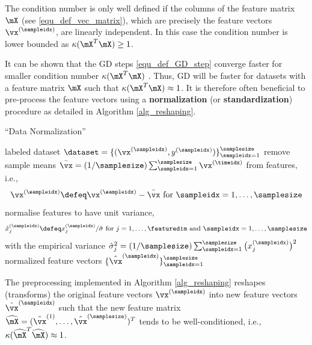 \documentclass[12pt]{report}
\begin{document}
The condition number is only well defined if the columns of the feature matrix $\mX$ 
(see \eqref{equ_def_vec_matrix}), which are precisely the feature vectors $\vx^{(\sampleidx)}$, 
are linearly independent. In this case the condition number is lower bounded 
as $\kappa( \mX^{T} \mX) \geq 1$. 

It can be shown that the GD steps \eqref{equ_def_GD_step} converge faster for 
smaller condition number $\kappa( \mX^{T} \mX)$ \cite{JungFixedPoint}. Thus, GD 
will be faster for datasets with a feature matrix $\mX$ such that  $\kappa( \mX^{T} \mX) \approx 1$. 
It is therefore often beneficial to pre-process the feature vectors using a {\bf normalization} 
(or {\bf standardization}) procedure as detailed in Algorithm \ref{alg_reshaping}. 
 
 \begin{algorithm}[htbp]
\caption{``Data Normalization''}\label{alg_reshaping}
\begin{algorithmic}[1]
\renewcommand{\algorithmicrequire}{\textbf{Input:}}
\renewcommand{\algorithmicensure}{\textbf{Output:}}
\Require   labeled dataset $\dataset = \{(\vx^{(\sampleidx)},y^{(\sampleidx)})\}_{\sampleidx=1}^{\samplesize}$
\vspace*{2mm}
\State remove sample means $\bar{\vx}=(1/\samplesize) \sum_{\sampleidx=1}^{\samplesize}  \vx^{(\timeidx)}$ from features, i.e., 
 \begin{equation}
 \nonumber
 \vx^{(\sampleidx)} \defeq \vx^{(\sampleidx)} - \bar{\vx} \mbox{ for  }  \sampleidx=1,\ldots,\samplesize
 \end{equation} 
\State normalise features to have unit variance,  
 \begin{equation} 
 \nonumber
 \hat{x}^{(\sampleidx)}_{j} \defeq x^{(\sampleidx)}_{j}/ \hat{\sigma}   \mbox{ for  } j=1,\ldots,\featuredim \mbox{ and } \sampleidx=1,\ldots,\samplesize
 \end{equation}
 with the empirical variance $\hat{\sigma}_{j}^{2}  =(1/\samplesize) \sum_{\sampleidx=1}^{\samplesize} \big( x^{(\sampleidx)}_{j} \big)^{2}$ 
\Ensure normalized feature vectors $\{\hat{\vx}^{(\sampleidx)}\}_{\sampleidx=1}^{\samplesize}$
\end{algorithmic}
\end{algorithm}
The preprocessing implemented in Algorithm \ref{alg_reshaping} reshapes (transforms) the 
original feature vectors $\vx^{(\sampleidx)}$ into new feature vectors $\hat{\vx}^{(\sampleidx)}$ 
such that the new feature matrix $\widehat{\mX} = (\hat{\vx}^{(1)},\ldots,\hat{\vx}^{(\samplesize)})^{T}$ 
tends to be well-conditioned, i.e., $\kappa( \widehat{\mX}^{T} \widehat{\mX}) \approx 1$. 
\end{document}
